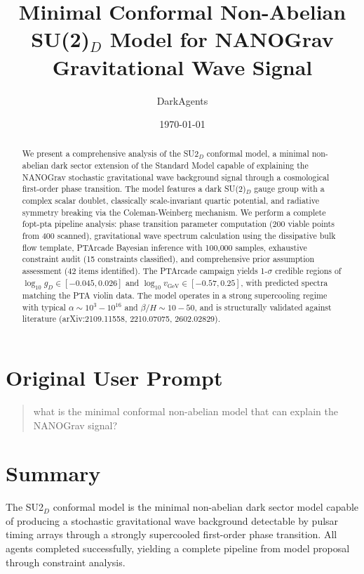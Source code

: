 \documentclass[11pt,a4paper,oneside]{article}
\title{Minimal Conformal Non-Abelian SU(2)$_D$ Model for NANOGrav \\ Gravitational Wave Signal}
\author{DarkAgents}
\date{\today}
\begin{document}
\maketitle

\begin{abstract}
We present a comprehensive analysis of the SU2$_D$ conformal model, a minimal non-abelian dark sector extension of the Standard Model capable of explaining the NANOGrav stochastic gravitational wave background signal through a cosmological first-order phase transition. The model features a dark SU(2)$_D$ gauge group with a complex scalar doublet, classically scale-invariant quartic potential, and radiative symmetry breaking via the Coleman-Weinberg mechanism. We perform a complete fopt-pta pipeline analysis: phase transition parameter computation (200 viable points from 400 scanned), gravitational wave spectrum calculation using the dissipative bulk flow template, PTArcade Bayesian inference with 100,000 samples, exhaustive constraint audit (15 constraints classified), and comprehensive prior assumption assessment (42 items identified). The PTArcade campaign yields 1-$\sigma$ credible regions of $\log_{10} g_D \in [-0.045, 0.026]$ and $\log_{10} v_{\text{GeV}} \in [-0.57, 0.25]$, with predicted spectra matching the PTA violin data. The model operates in a strong supercooling regime with typical $\alpha \sim 10^{3}{-}10^{16}$ and $\beta/H \sim 10{-}50$, and is structurally validated against literature (arXiv:2109.11558, 2210.07075, 2602.02829).
\end{abstract}

\section*{Original User Prompt}
\begin{quote}
what is the minimal conformal non-abelian model that can explain the NANOGrav signal?
\end{quote}

\section{Summary}
\label{sec:summary}

The SU2$_D$ conformal model is the minimal non-abelian dark sector model capable of producing a stochastic gravitational wave background detectable by pulsar timing arrays through a strongly supercooled first-order phase transition. All agents completed successfully, yielding a complete pipeline from model proposal through constraint analysis.
\end{document}
